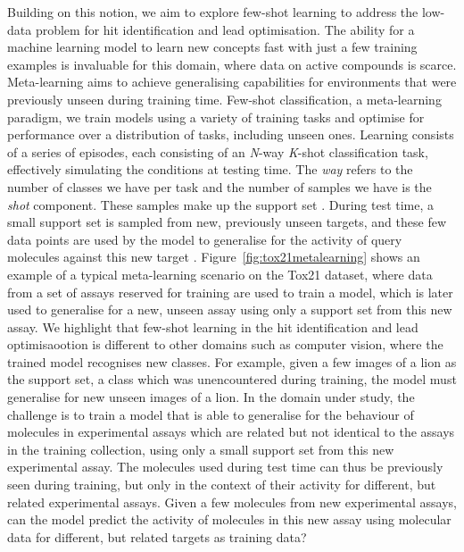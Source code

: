 Building on this notion, we aim to explore few-shot learning to address the low-data problem for hit identification and lead optimisation. The ability for a machine learning model to learn new concepts fast with just a few training examples is invaluable for this domain, where data on active compounds is scarce. Meta-learning aims to achieve generalising capabilities for environments that were previously unseen during training time. Few-shot classification, a meta-learning paradigm, we train models using a variety of training tasks and optimise for performance over a distribution of tasks, including unseen ones. Learning consists of a series of episodes, each consisting of an \textit{N}-way \textit{K}-shot classification task, effectively simulating the conditions at testing time. The \textit{way} refers to the number of classes we have per task and the number of samples we have is the \textit{shot} component. These samples make up the support set \cite{snell2017prototypical}. During test time, a small support set is sampled from new, previously unseen targets, and these few data points are used by the model to generalise for the activity of query molecules against this new target \cite{vinyals2016matching}. Figure~\ref{fig:tox21metalearning} shows an example of a typical meta-learning scenario on the Tox21 dataset, where data from a set of assays reserved for training are used to train a model, which is later used to generalise for a new, unseen assay using only a support set from this new assay. We highlight that few-shot learning in the hit identification and lead optimisaootion is different to other domains such as computer vision, where the trained model recognises new classes. For example, given a few images of a lion as the support set, a class which was unencountered during training, the model must generalise for new unseen images of a lion. In the domain under study, the challenge is to train a model that is able to generalise for the behaviour of molecules in experimental assays which are related but not identical to the assays in the training collection, using only a small support set from this new experimental assay. The molecules used during test time can thus be previously seen during training, but only in the context of their activity for different, but related experimental assays. Given a few molecules from new experimental assays, can the model predict the activity of molecules in this new assay using molecular data for different, but related targets as training data?

